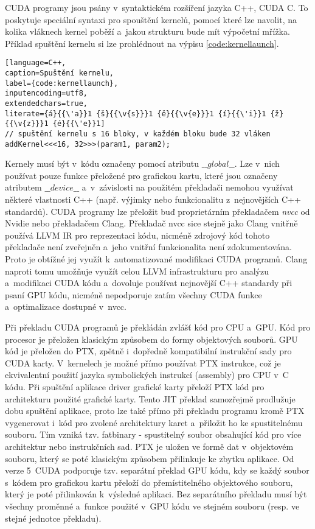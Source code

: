 CUDA programy jsou psány v~syntaktickém rozšíření jazyka C++, CUDA C. To poskytuje speciální syntaxi pro spouštění kernelů, pomocí které lze navolit, na kolika vláknech kernel poběží a~jakou strukturu bude mít výpočetní mřížka. Příklad spuštění kernelu si lze prohlédnout na výpisu \ref{code:kernellaunch}.

\begin{lstlisting}[language=C++,
caption=Spuštění kernelu,
label={code:kernellaunch},
inputencoding=utf8,
extendedchars=true,
literate={á}{{\'a}}1 {š}{{\v{s}}}1 {ě}{{\v{e}}}1 {í}{{\'i}}1 {ž}{{\v{z}}}1 {é}{{\'e}}1]
// spuštění kernelu s 16 bloky, v každém bloku bude 32 vláken
addKernel<<<16, 32>>>(param1, param2);
\end{lstlisting}

Kernely musí být v~kódu označeny pomocí atributu $\_\_global\_\_$. Lze v~nich používat pouze funkce přeložené pro grafickou kartu, které jsou označeny atributem $\_\_device\_\_$ a~v~závislosti na použitém překladači nemohou využívat některé vlastnosti C++ (např. výjimky nebo funkcionalitu z~nejnovějších C++ standardů). CUDA programy lze přeložit buď proprietárním překladačem \emph{nvcc} od Nvidie nebo překladačem Clang. Překladač nvcc sice stejně jako Clang vnitřně používá LLVM IR pro reprezentaci kódu, nicméně zdrojový kód tohoto překladače není zveřejněn a~jeho vnitřní funkcionalita není zdokumentována. Proto je obtížné jej využít k~automatizované modifikaci CUDA programů. Clang naproti tomu umožňuje využít celou LLVM infrastrukturu pro analýzu a~modifikaci CUDA kódu a~dovoluje používat nejnovější C++ standardy při psaní GPU kódu, nicméně nepodporuje zatím všechny CUDA funkce a~optimalizace dostupné v~nvcc.

Při překladu CUDA programů je překládán zvlášť kód pro CPU a~GPU. Kód pro procesor je přeložen klasickým způsobem do formy objektových souborů. GPU kód je přeložen do PTX, zpětně i~dopředně kompatibilní instrukční sady pro CUDA karty. V~kernelech je možné přímo používat PTX instrukce, což je ekvivalentní použití jazyka symbolických instrukcí (assembly) pro CPU v~C kódu. Při spuštění aplikace driver grafické karty přeloží PTX kód pro architekturu použité grafické karty. Tento JIT překlad samozřejmě prodlužuje dobu spuštění aplikace, proto lze také přímo při překladu programu kromě PTX vygenerovat i~kód pro zvolené architektury karet a~přiložit ho ke spustitelnému souboru. Tím vzniká tzv. fatbinary - spustitelný soubor obsahující kód pro více architektur nebo instrukčních sad. PTX je uložen ve formě dat v~objektovém souboru, který se poté klasickým způsobem přilinkuje ke zbytku aplikace. Od verze 5~CUDA podporuje tzv. separátní překlad GPU kódu, kdy se každý soubor s~kódem pro grafickou kartu přeloží do přemístitelného objektového souboru, který je poté přilinkován k~výsledné aplikaci. Bez separátního překladu musí být všechny proměnné a~funkce použité v~GPU kódu ve stejném souboru (resp. ve stejné jednotce překladu).


